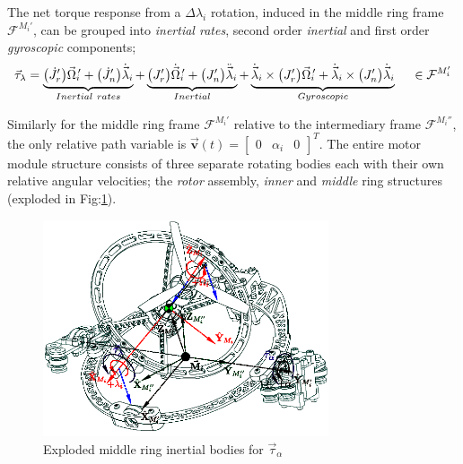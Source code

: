 The net torque response from a $\Delta\lambda_i$ rotation, induced in the middle ring frame $\mathcal{F}^{M_i'}$, can be grouped into \emph{inertial rates}, second order \emph{inertial} and first order \emph{gyroscopic} components;
\begin{equation}\label{eq:torque-induced-inner}
\vec{\tau}_\lambda=\underbrace{\big(\dot{J}_{r}'\big)\vec{\Omega}_i\text{}\hspace{-2pt}'+\big(\dot{J}_{n}'\big)\dot{\vec{\lambda}}_i}_{Inertial~rates}+\underbrace{\big(J_r'\big)\dot{\vec{\Omega}}_i\text{}\hspace{-2pt}'+\big(J_{n}'\big)\ddot{\vec{\lambda}}_i}_{Inertial}+\underbrace{\dot{\vec{\lambda}}_i\times \big(J_r'\big)\vec{\Omega}_i\text{}\hspace{-2pt}'+\dot{\vec{\lambda}}_i\times \big(J_{n}'\big)\dot{\vec{\lambda}}_i}_{Gyroscopic}~~~~\in\mathcal{F}^{M_i'}
\end{equation}
\par
Similarly for the middle ring frame $\mathcal{F}^{M_i'}$ relative to the intermediary frame $\mathcal{F}^{M_i''}$, the only relative path variable is $\vec{\mathbf{v}}(t)=\begin{bmatrix}0 & \alpha_i & 0\end{bmatrix}^T$. The entire motor module structure consists of three separate rotating bodies each with their own relative angular velocities; the \emph{rotor} assembly, \emph{inner} and \emph{middle} ring structures (exploded in Fig:\ref{fig:response-middle}).
\begin{figure}[htbp]
\centering
\includegraphics[width=0.75\textwidth]{figs/response-middle}
\caption{Exploded middle ring inertial bodies for $\vec{\tau}_{\alpha}$}
\label{fig:response-middle}
\vspace{-16pt}
\end{figure}
